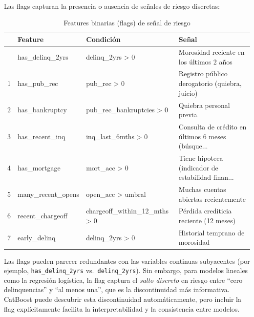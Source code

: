 \documentclass[
  spanish,
  11pt,
  letterpaper,
]{scrbook}
\theoremstyle{plain}
\theoremstyle{remark}
\begin{document}
Las flags capturan la presencia o ausencia de señales de riesgo
discretas:

{

\begin{longtable}[]{@{}llll@{}}

\caption{\label{tbl-flag-features}Features binarias (flags) de señal de
riesgo}

\tabularnewline

\toprule\noalign{}
& Feature & Condición & Señal \\
\midrule\noalign{}
\endhead
\bottomrule\noalign{}
\endlastfoot
0 & has\_delinq\_2yrs & delinq\_2yrs \textgreater{} 0 & Morosidad
reciente en los últimos 2 años \\
1 & has\_pub\_rec & pub\_rec \textgreater{} 0 & Registro público
derogatorio (quiebra, juicio) \\
2 & has\_bankruptcy & pub\_rec\_bankruptcies \textgreater{} 0 & Quiebra
personal previa \\
3 & has\_recent\_inq & inq\_last\_6mths \textgreater{} 0 & Consulta de
crédito en últimos 6 meses (búsque... \\
4 & has\_mortgage & mort\_acc \textgreater{} 0 & Tiene hipoteca
(indicador de estabilidad finan... \\
5 & many\_recent\_opens & open\_acc \textgreater{} umbral & Muchas
cuentas abiertas recientemente \\
6 & recent\_chargeoff & chargeoff\_within\_12\_mths \textgreater{} 0 &
Pérdida crediticia reciente (12 meses) \\
7 & early\_delinq & delinq\_2yrs \textgreater{} 0 & Historial temprano
de morosidad \\

\end{longtable}

}

\begin{tcolorbox}[enhanced jigsaw, arc=.35mm, bottomrule=.15mm, bottomtitle=1mm, breakable, colback=white, colbacktitle=quarto-callout-note-color!10!white, colframe=quarto-callout-note-color-frame, coltitle=black, left=2mm, leftrule=.75mm, opacityback=0, opacitybacktitle=0.6, rightrule=.15mm, title=\textcolor{quarto-callout-note-color}{\faInfo}\hspace{0.5em}{Flags vs.~variables continuas}, titlerule=0mm, toprule=.15mm, toptitle=1mm]

Las flags pueden parecer redundantes con las variables continuas
subyacentes (por ejemplo, \texttt{has\_delinq\_2yrs}
vs.~\texttt{delinq\_2yrs}). Sin embargo, para modelos lineales como la
regresión logística, la flag captura el \emph{salto discreto} en riesgo
entre ``cero delinquencias'' y ``al menos una'', que es la
discontinuidad más informativa. CatBoost puede descubrir esta
discontinuidad automáticamente, pero incluir la flag explícitamente
facilita la interpretabilidad y la consistencia entre modelos.

\end{tcolorbox}
\end{document}
